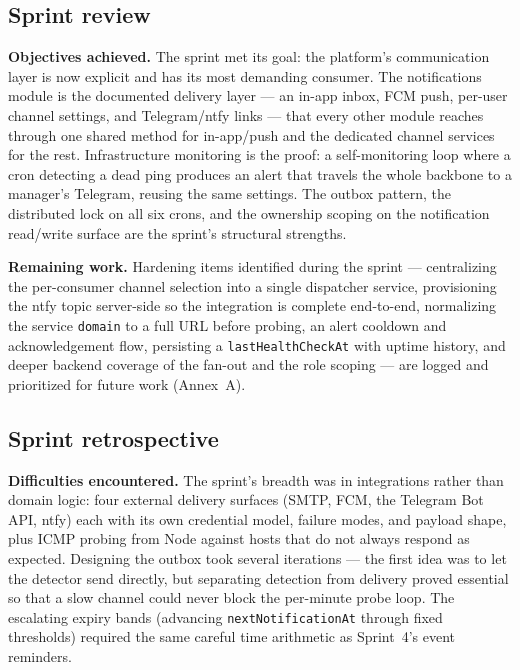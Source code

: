 \subsection{Sprint review}

\textbf{Objectives achieved.} The sprint met its goal: the platform's communication layer is
now explicit and has its most demanding consumer. The notifications module is the documented
delivery layer --- an in-app inbox, FCM push, per-user channel settings, and Telegram/ntfy links ---
that every other module reaches through one shared method for in-app/push and the dedicated
channel services for the rest. Infrastructure monitoring is the proof: a self-monitoring loop
where a cron detecting a dead ping produces an alert that travels the whole backbone to a
manager's Telegram, reusing the same settings. The outbox pattern, the distributed lock on all
six crons, and the ownership scoping on the notification read/write surface are the sprint's
structural strengths.

\textbf{Remaining work.} Hardening items identified during the sprint --- centralizing the
per-consumer channel selection into a single dispatcher service, provisioning the ntfy topic
server-side so the integration is complete end-to-end, normalizing the service \texttt{domain} to
a full URL before probing, an alert cooldown and acknowledgement flow, persisting a
\texttt{lastHealthCheckAt} with uptime history, and deeper backend coverage of the fan-out and
the role scoping --- are logged and prioritized for future work (Annex~A).

\subsection{Sprint retrospective}

\textbf{Difficulties encountered.} The sprint's breadth was in integrations rather than domain
logic: four external delivery surfaces (SMTP, FCM, the Telegram Bot API, ntfy) each with its
own credential model, failure modes, and payload shape, plus ICMP probing from Node against
hosts that do not always respond as expected. Designing the outbox took several
iterations --- the first idea was to let the detector send directly, but separating detection
from delivery proved essential so that a slow channel could never block the per-minute probe
loop. The escalating expiry
bands (advancing \texttt{nextNotificationAt} through fixed thresholds) required the same
careful time arithmetic as Sprint~4's event reminders.

